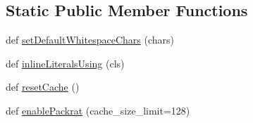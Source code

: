 \subsection*{Static Public Member Functions}
\begin{DoxyCompactItemize}
\item 
def \hyperlink{classpyparsing_1_1ParserElement_a638b41abeb01b5133d30c1ba1fc075d8}{set\+Default\+Whitespace\+Chars} (chars)
\item 
def \hyperlink{classpyparsing_1_1ParserElement_a353358c20d9ddcb673365ce17a79bc8c}{inline\+Literals\+Using} (cls)
\item 
def \hyperlink{classpyparsing_1_1ParserElement_aa617897bf2e4c86925ef07ef57cd8665}{reset\+Cache} ()
\item 
def \hyperlink{classpyparsing_1_1ParserElement_a86772c01db5d9a951c955c9028946d46}{enable\+Packrat} (cache\+\_\+size\+\_\+limit=128)
\end{DoxyCompactItemize}
